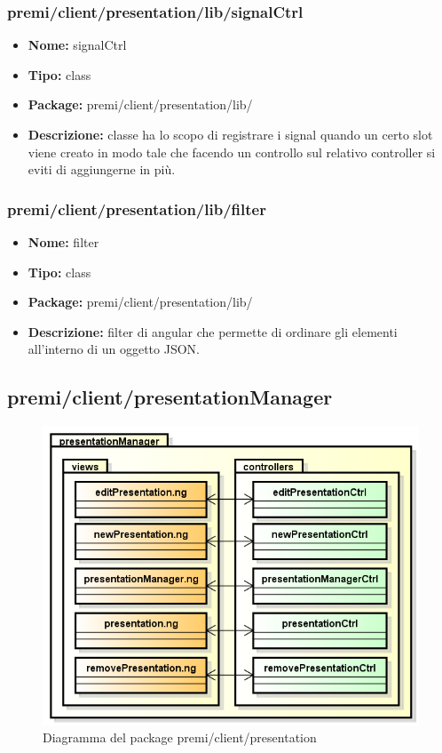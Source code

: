\subsubsection{premi/client/presentation/lib/signalCtrl}
\begin{itemize}
  \item[] \textbf{Nome:} signalCtrl
  \item[] \textbf{Tipo:} class
  \item[] \textbf{Package:} premi/client/presentation/lib/
  \item[] \textbf{Descrizione:} classe ha lo scopo di registrare i signal quando un certo slot viene creato in modo tale che facendo un controllo sul relativo controller si eviti di aggiungerne in più.
\end{itemize}

\subsubsection{premi/client/presentation/lib/filter}
\begin{itemize}
  \item[] \textbf{Nome:} filter
  \item[] \textbf{Tipo:} class
  \item[] \textbf{Package:} premi/client/presentation/lib/
  \item[] \textbf{Descrizione:} filter di angular che permette di ordinare gli elementi all'interno di un oggetto JSON. 
\end{itemize}



\subsection{premi/client/presentationManager}
\begin{figure}[!h]
\begin{center}
\includegraphics[scale=0.45]{img/diapkg/presentationManager.png}
\caption{Diagramma del package premi/client/presentation}
\end{center}
\end{figure}


